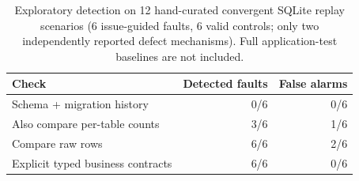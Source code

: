 \begin{table}[t]
\centering
\caption{Exploratory detection on 12 hand-curated convergent SQLite replay
scenarios (6 issue-guided faults, 6 valid controls; only two independently
reported defect mechanisms). Full application-test baselines are not included.}
\label{tab:n22_replay}
\begin{tabular}{lrr}
\toprule
Check & Detected faults & False alarms \\
\midrule
Schema + migration history & 0/6 & 0/6 \\
Also compare per-table counts & 3/6 & 1/6 \\
Compare raw rows & 6/6 & 2/6 \\
Explicit typed business contracts & 6/6 & 0/6 \\
\bottomrule
\end{tabular}
\end{table}

